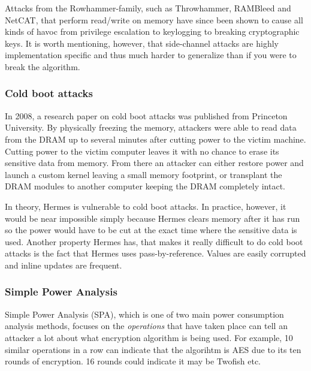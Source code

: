 Attacks from the Rowhammer-family, such as Throwhammer, RAMBleed and NetCAT, that perform read/write on memory have since been shown to cause all kinds of havoc from privilege escalation to keylogging to breaking cryptographic keys\cite{tatar_throwhammer:_2018, kwong2020rambleed, kurth_netcat:_2020}.
It is worth mentioning, however, that side-channel attacks are highly implementation specific and thus much harder to generalize than if you were to break the algorithm.

\subsubsection{Cold boot attacks}
In 2008, a research paper on cold boot attacks\cite{Halderman2008LestKeys} was published from Princeton University. By physically freezing the memory, attackers were able to read data from the DRAM up to several minutes after cutting power to the victim machine. Cutting power to the victim computer leaves it with no chance to erase its sensitive data from memory. From there an attacker can either restore power and launch a custom kernel leaving a small memory footprint, or transplant the DRAM modules to another computer keeping the DRAM completely intact.

In theory, Hermes is vulnerable to cold boot attacks. In practice, however, it would be near impossible simply because Hermes clears memory after it has run so the power would have to be cut at the exact time where the sensitive data is used. Another property Hermes has, that makes it really difficult to do cold boot attacks is the fact that Hermes uses pass-by-reference. Values are easily corrupted and inline updates are frequent.

\subsubsection{Simple Power Analysis}
Simple Power Analysis (SPA), which is one of two main power consumption analysis methods, focuses on the \emph{operations} that have taken place can tell an attacker a lot about what encryption algorithm is being used.
For example, 10 similar operations in a row can indicate that the algorihtm is AES due to its ten rounds of encryption. 16 rounds could indicate it may be Twofish etc.

